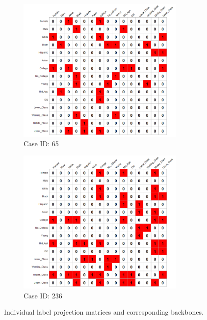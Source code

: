 \documentclass[12pt]{article}
\begin{document}
\begin{figure}[ht!]
\begin{subfigure}[b]{0.49\textwidth}
            \label{fig:ind-ex-cp2}
    \end{subfigure}
     \begin{subfigure}[b]{0.49\textwidth}
        \includegraphics[trim={1cm 0cm 0cm 0cm},clip, width=0.9\textwidth]{Plots/data-ex-cbb1.png}
            \caption{Case ID: 65}
            \label{fig:ind-ex-cbb1}
    \end{subfigure}
     \begin{subfigure}[b]{0.49\textwidth}
        \includegraphics[trim={1cm 0cm 0cm 0cm},clip, width=0.9\textwidth]{Plots/data-ex-cbb2.png}
            \caption{Case ID: 236}
            \label{fig:ind-ex-cbb2}
    \end{subfigure}
    \caption{Individual label projection matrices and corresponding backbones.}
    \label{fig:ind-ex-cp}
\end{figure}
\end{document}
